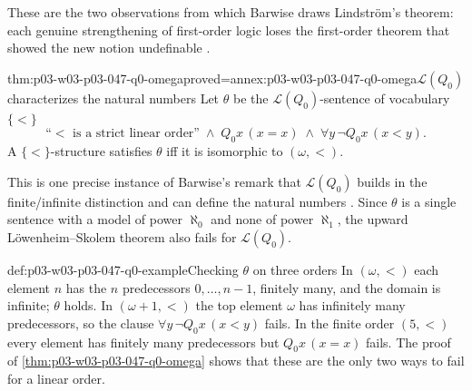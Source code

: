 These are the two observations from which Barwise draws Lindstr\"om's
theorem: each genuine strengthening of first-order logic loses the
first-order theorem that showed the new notion undefinable
\cite[Ch.~I, \S2.1, p.~14]{Barwise1985BackgroundAims}.

\begin{hbtheorem}{thm:p03-w03-p03-047-q0-omega}{proved=annex:p03-w03-p03-047-q0-omega}{\(\mathscr L(Q_0)\) characterizes the natural numbers}
Let \(\theta\) be the \(\mathscr L(Q_0)\)-sentence of vocabulary \(\{<\}\)
\[
 \text{``}<\text{ is a strict linear order''}
 \;\land\; Q_0x\,(x=x)
 \;\land\;\forall y\,\neg Q_0x\,(x<y).
\]
A \(\{<\}\)-structure satisfies \(\theta\) iff it is isomorphic to
\((\omega,<)\).
\end{hbtheorem}

This is one precise instance of Barwise's remark that \(\mathscr L(Q_0)\)
builds in the finite/infinite distinction and can define the natural numbers
\cite[Ch.~I, \S1.5, p.~8]{Barwise1985BackgroundAims}.  Since \(\theta\) is a
single sentence with a model of power \(\aleph_0\) and none of power
\(\aleph_1\), the upward L\"owenheim--Skolem theorem also fails for
\(\mathscr L(Q_0)\).

\begin{hbexample}{def:p03-w03-p03-047-q0-example}{Checking \(\theta\) on three orders}
In \((\omega,<)\) each element \(n\) has the \(n\) predecessors
\(0,\dots,n-1\), finitely many, and the domain is infinite; \(\theta\)
holds.  In \((\omega+1,<)\) the top element \(\omega\) has infinitely many
predecessors, so the clause \(\forall y\,\neg Q_0x\,(x<y)\) fails.  In the
finite order \((5,<)\) every element has finitely many predecessors but
\(Q_0x\,(x=x)\) fails.  The proof of
\cref{thm:p03-w03-p03-047-q0-omega} shows that these are the only two ways
to fail for a linear order.
\end{hbexample}

